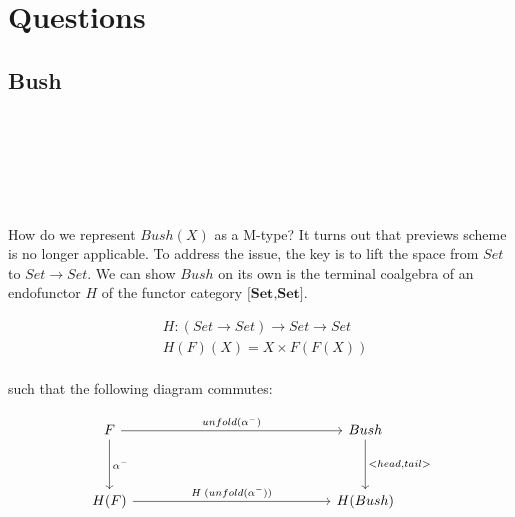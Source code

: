 \section{Questions}

\subsection{Bush}

\begin{code}%
\>[0]\AgdaSpace{}%
\AgdaSpace{}%
\AgdaSymbol{(}\AgdaSpace{}%
\AgdaSymbol{:}\AgdaSpace{}%
\AgdaSymbol{)}\AgdaSpace{}%
\AgdaSymbol{:}\AgdaSpace{}%
\AgdaSpace{}%
\<%
\\
\>[0][@{}l@{\AgdaIndent{0}}]%
\>[2]\<%
\\
%
\>[2]\<%
\\
\>[2][@{}l@{\AgdaIndent{0}}]%
\>[4]\AgdaSpace{}%
\AgdaSymbol{:}\AgdaSpace{}%
\<%
\\
%
\>[4]\AgdaSpace{}%
\AgdaSymbol{:}\AgdaSpace{}%
\AgdaSpace{}%
\AgdaSymbol{(}\AgdaSpace{}%
\AgdaSymbol{)}\<%
\\
\>[0]\AgdaSpace{}%
\<%
\end{code}

How do we represent $Bush(X)$ as a M-type? It turns out that previews scheme is no longer applicable. To address the issue, the key is to lift the space from $Set$ to $Set \to Set$. We can show $Bush$ on its own is the terminal coalgebra of an endofunctor $H$ of the functor category $\textbf{[Set,Set]}$.

\begin{align*}
& H : (Set \to Set) \to Set \to Set \\
& H (F) (X) = X \times F (F (X)) \\
\end{align*}

such that the following diagram commutes:

\[
\begin{tikzcd}[row sep=huge, column sep=5.0cm]
F \arrow[r, "unfold(\alpha^{-})"] \arrow[d, "\alpha^{-}"]
& Bush \arrow[d, "{<head,tail>}"] \\
H(F) \arrow[r, "H\;(unfold(\alpha^{-}))"]
& H(Bush)
\end{tikzcd}
\]